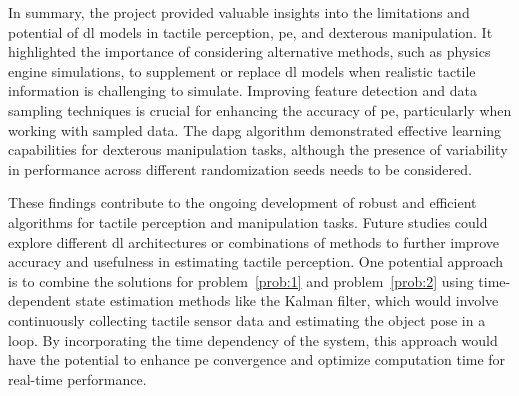 In summary, the project provided valuable insights into the limitations and potential of \gls{dl} models in tactile perception, \gls{pe}, and dexterous manipulation. It highlighted the importance of considering alternative methods, such as physics engine simulations, to supplement or replace \gls{dl} models when realistic tactile information is challenging to simulate. Improving feature detection and data sampling techniques is crucial for enhancing the accuracy of \gls{pe}, particularly when working with sampled data. The \gls{dapg} algorithm demonstrated effective learning capabilities for dexterous manipulation tasks, although the presence of variability in performance across different randomization seeds needs to be considered. \medskip

These findings contribute to the ongoing development of robust and efficient algorithms for tactile perception and manipulation tasks. Future studies could explore different \gls{dl} architectures or combinations of methods to further improve accuracy and usefulness in estimating tactile perception. One potential approach is to combine the solutions for problem~\ref{prob:1} and problem~\ref{prob:2} using time-dependent state estimation methods like the Kalman filter, which would involve continuously collecting tactile sensor data and estimating the object pose in a loop. By incorporating the time dependency of the system, this approach would have the potential to enhance \gls{pe} convergence and optimize computation time for real-time performance.
